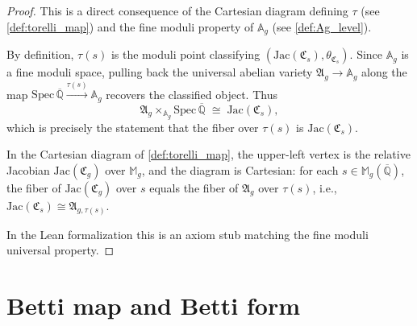 \begin{proof}
  This is a direct consequence of the Cartesian diagram defining \(\tau\)
  (see \cref{def:torelli_map}) and the fine moduli property of \(\mathbb{A}_g\)
  (see \cref{def:Ag_level}).

  By definition, \(\tau(s)\) is the moduli point classifying
  \((\mathrm{Jac}(\mathfrak{C}_s), \theta_{\mathfrak{C}_s})\). Since
  \(\mathbb{A}_g\) is a fine moduli space, pulling back the universal abelian
  variety \(\mathfrak{A}_g \to \mathbb{A}_g\) along the map
  \(\mathrm{Spec}\,\overline{\mathbb{Q}} \xrightarrow{\tau(s)} \mathbb{A}_g\)
  recovers the classified object. Thus
  \[
    \mathfrak{A}_g \times_{\mathbb{A}_g} \mathrm{Spec}\,\overline{\mathbb{Q}}
    \;\cong\; \mathrm{Jac}(\mathfrak{C}_s),
  \]
  which is precisely the statement that the fiber over \(\tau(s)\) is
  \(\mathrm{Jac}(\mathfrak{C}_s)\).

  In the Cartesian diagram of \cref{def:torelli_map}, the upper-left vertex is the
  relative Jacobian \(\mathrm{Jac}(\mathfrak{C}_g)\) over \(\mathbb{M}_g\), and the
  diagram is Cartesian: for each \(s \in \mathbb{M}_g(\overline{\mathbb{Q}})\),
  the fiber of \(\mathrm{Jac}(\mathfrak{C}_g)\) over \(s\) equals the fiber of
  \(\mathfrak{A}_g\) over \(\tau(s)\), i.e.,
  \(\mathrm{Jac}(\mathfrak{C}_s) \cong \mathfrak{A}_{g,\tau(s)}\).

  In the Lean formalization this is an axiom stub matching the fine moduli
  universal property.
\end{proof}

\section{Betti map and Betti form}

